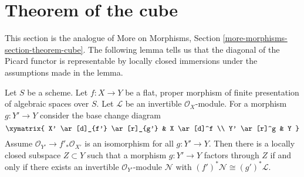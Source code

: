 \section{Theorem of the cube}
\label{section-theorem-cube}

\noindent
This section is the analogue of More on Morphisms, Section
\ref{more-morphisms-section-theorem-cube}.
The following lemma tells us that the diagonal of the Picard
functor is representable by locally closed immersions under
the assumptions made in the lemma.

\begin{lemma}
\label{lemma-diagonal-picard-flat-proper}
Let $S$ be a scheme.
Let $f : X \to Y$ be a flat, proper morphism of finite presentation
of algebraic spaces over $S$.
Let $\mathcal{L}$ be an invertible $\mathcal{O}_X$-module.
For a morphism $g : Y' \to Y$ consider the base change diagram
$$
\xymatrix{
X' \ar[d]_{f'} \ar[r]_{g'} & X \ar[d]^f \\
Y' \ar[r]^g & Y
}
$$
Assume $\mathcal{O}_{Y'} \to f'_*\mathcal{O}_{X'}$ is an
isomorphism for all $g : Y' \to Y$.
Then there is a locally closed subspace $Z \subset Y$ such that
a morphism $g : Y' \to Y$ factors through $Z$ if and only if
there exists an invertible $\mathcal{O}_{Y'}$-module $\mathcal{N}$
with $(f')^*\mathcal{N} \cong (g')^*\mathcal{L}$.
\end{lemma}


